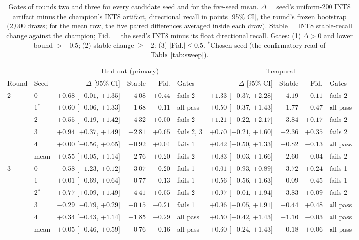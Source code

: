 \documentclass[10pt,twocolumn]{article}
\begin{document}
\begin{table}[!tp]
\centering
\caption{Gates of rounds two and three for every candidate seed and for
the five-seed mean. $\Delta$ = seed's uniform-200 INT8 artifact minus the
champion's INT8 artifact, directional recall in points [95\% CI], the
round's frozen bootstrap (2,000 draws; for the mean row, the five paired
differences averaged inside each draw). Stable = INT8 stable-recall change
against the champion; Fid.\ = the seed's INT8 minus its float directional
recall. Gates: (1) $\Delta>0$ and lower bound $>-0.5$; (2) stable change
$\geq -2$; (3) $|$Fid.$|\leq 0.5$. $^\ast$Chosen seed (the confirmatory
read of Table~\ref{tab:sweep}).}
\label{tab:seedgates}
\footnotesize
\setlength{\tabcolsep}{4pt}
\begin{tabular}{@{}llrrrlrrrl@{}}
\toprule
& & \multicolumn{4}{c}{Held-out (primary)} & \multicolumn{4}{c}{Temporal} \\
\cmidrule(lr){3-6}\cmidrule(l){7-10}
Round & Seed & $\Delta$ [95\% CI] & Stable & Fid. & Gates & $\Delta$ [95\% CI] & Stable & Fid. & Gates \\
\midrule
2 & 0 & $+0.68$ [$-0.01$, $+1.35$] & $-4.08$ & $+0.44$ & fails 2 & $+1.33$ [$+0.37$, $+2.28$] & $-4.19$ & $-0.11$ & fails 2 \\
  & 1$^\ast$ & $+0.60$ [$-0.06$, $+1.33$] & $-1.68$ & $-0.11$ & all pass & $+0.50$ [$-0.37$, $+1.43$] & $-1.77$ & $-0.47$ & all pass \\
  & 2 & $+0.55$ [$-0.19$, $+1.42$] & $-4.32$ & $+0.00$ & fails 2 & $+1.21$ [$+0.22$, $+2.17$] & $-3.84$ & $+0.17$ & fails 2 \\
  & 3 & $+0.94$ [$+0.37$, $+1.49$] & $-2.81$ & $+0.65$ & fails 2, 3 & $+0.70$ [$-0.21$, $+1.60$] & $-2.36$ & $+0.35$ & fails 2 \\
  & 4 & $+0.00$ [$-0.56$, $+0.65$] & $-0.92$ & $+0.04$ & fails 1 & $+0.42$ [$-0.50$, $+1.33$] & $-0.82$ & $-0.13$ & all pass \\
  & mean & $+0.55$ [$+0.05$, $+1.14$] & $-2.76$ & $+0.20$ & fails 2 & $+0.83$ [$+0.03$, $+1.66$] & $-2.60$ & $-0.04$ & fails 2 \\
\midrule
3 & 0 & $-0.58$ [$-1.23$, $+0.12$] & $+3.07$ & $-0.20$ & fails 1 & $+0.01$ [$-0.93$, $+0.89$] & $+3.72$ & $+0.24$ & fails 1 \\
  & 1 & $+0.01$ [$-0.69$, $+0.64$] & $-0.77$ & $-0.13$ & fails 1 & $+0.56$ [$-0.56$, $+1.63$] & $-0.09$ & $-0.45$ & fails 1 \\
  & 2$^\ast$ & $+0.77$ [$+0.09$, $+1.49$] & $-4.41$ & $+0.05$ & fails 2 & $+0.97$ [$-0.01$, $+1.94$] & $-3.83$ & $+0.09$ & fails 2 \\
  & 3 & $-0.29$ [$-0.79$, $+0.29$] & $+0.15$ & $-0.21$ & fails 1 & $+0.96$ [$+0.05$, $+1.91$] & $+0.44$ & $+0.48$ & all pass \\
  & 4 & $+0.34$ [$-0.43$, $+1.14$] & $-1.85$ & $-0.29$ & all pass & $+0.50$ [$-0.42$, $+1.43$] & $-1.16$ & $-0.03$ & all pass \\
  & mean & $+0.05$ [$-0.46$, $+0.59$] & $-0.76$ & $-0.16$ & all pass & $+0.60$ [$-0.24$, $+1.43$] & $-0.18$ & $+0.06$ & all pass \\
\bottomrule
\end{tabular}
\end{table}
\end{document}
